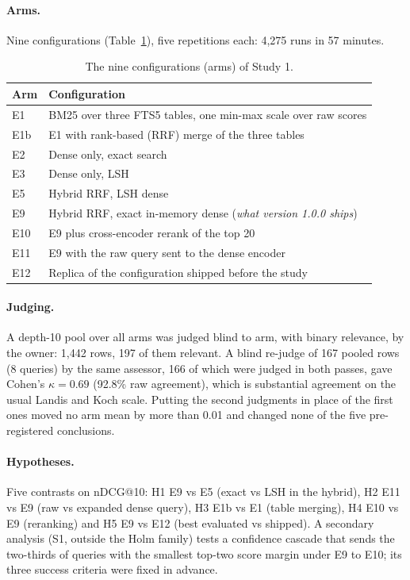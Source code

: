 \documentclass[pdflatex,sn-basic,Numbered]{sn-jnl}
\makeatletter
\newcommand{\ndcg}{nDCG@10}
\makeatother
\begin{document}
\paragraph{Arms.} Nine configurations (Table~\ref{tab:arms}), five repetitions each: 4,275 runs in 57 minutes.

\begin{table}[tbp]
\centering\footnotesize\setlength{\tabcolsep}{3pt}
\caption{The nine configurations (arms) of Study 1.}
\label{tab:arms}
\begin{tabularx}{0.9\linewidth}{lX}
\toprule
Arm & Configuration \\
\midrule
E1 & BM25 over three FTS5 tables, one min-max scale over raw scores \\
E1b & E1 with rank-based (RRF) merge of the three tables \\
E2 & Dense only, exact search \\
E3 & Dense only, LSH \\
E5 & Hybrid RRF, LSH dense \\
E9 & Hybrid RRF, exact in-memory dense (\emph{what version 1.0.0 ships}) \\
E10 & E9 plus cross-encoder rerank of the top 20 \\
E11 & E9 with the raw query sent to the dense encoder \\
E12 & Replica of the configuration shipped before the study \\
\bottomrule
\end{tabularx}
\end{table}

\paragraph{Judging.} A depth-10 pool over all arms was judged blind to arm, with binary relevance, by the owner: 1,442 rows, 197 of them relevant. A blind re-judge of 167 pooled rows (8 queries) by the same assessor, 166 of which were judged in both passes, gave Cohen's $\kappa=0.69$ (92.8\% raw agreement), which is substantial agreement on the usual Landis and Koch scale. Putting the second judgments in place of the first ones moved no arm mean by more than 0.01 and changed none of the five pre-registered conclusions.

\paragraph{Hypotheses.} Five contrasts on \ndcg{}: H1 E9 vs E5 (exact vs LSH in the hybrid), H2 E11 vs E9 (raw vs expanded dense query), H3 E1b vs E1 (table merging), H4 E10 vs E9 (reranking) and H5 E9 vs E12 (best evaluated vs shipped). A secondary analysis (S1, outside the Holm family) tests a confidence cascade that sends the two-thirds of queries with the smallest top-two score margin under E9 to E10; its three success criteria were fixed in advance.
\end{document}
